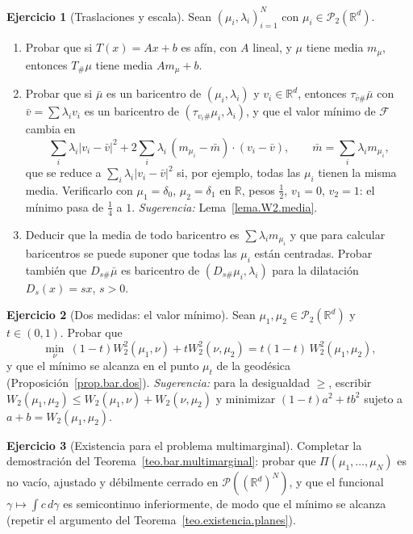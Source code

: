 \documentclass[12pt, a4paper]{amsbook}
\newcommand{\R}{{\mathbb R}}
\theoremstyle{remark}
\theoremstyle{definition}
\newtheorem{ejercicio}{Ejercicio}[chapter]
\numberwithin{section}{chapter}
\numberwithin{subsection}{section}
\numberwithin{equation}{section}
\numberwithin{figure}{chapter}
\begin{document}
\begin{ejercicio}[Traslaciones y escala]\label{ejer.bar.traslaciones}
Sean $(\mu_i,\lambda_i)_{i=1}^N$ con $\mu_i\in\mathcal P_2(\R^d)$.
\begin{enumerate}[label=(\alph*)]
\item Probar que si $T(x)=Ax+b$ es afín, con $A$ lineal, y
$\mu$ tiene media $m_\mu$, entonces $T_\#\mu$ tiene media $Am_\mu+b$.
\item Probar que si $\bar\mu$ es un baricentro de $(\mu_i,\lambda_i)$ y
$v_i\in\R^d$, entonces $\tau_{\bar v\#}\bar\mu$ con $\bar v=\sum\lambda_iv_i$
es un baricentro de $(\tau_{v_i\#}\mu_i,\lambda_i)$, y que el valor mínimo de
$\mathcal F$ cambia en
\[
\sum_i\lambda_i|v_i-\bar v|^2+2\sum_i\lambda_i\,(m_{\mu_i}-\bar m)\cdot(v_i-\bar v),
\qquad\bar m=\sum_i\lambda_im_{\mu_i},
\]
que se reduce a $\sum_i\lambda_i|v_i-\bar v|^2$ si, por ejemplo, todas las
$\mu_i$ tienen la misma media. Verificarlo con $\mu_1=\delta_0$,
$\mu_2=\delta_1$ en $\R$, pesos $\frac12$, $v_1=0$, $v_2=1$: el mínimo pasa
de $\frac14$ a $1$. \emph{Sugerencia:} Lema~\ref{lema.W2.media}.
\item Deducir que la media de todo baricentro es $\sum\lambda_im_{\mu_i}$ y
que para calcular baricentros se puede suponer que todas las $\mu_i$ están
centradas. Probar también que $D_{s\#}\bar\mu$ es baricentro de
$(D_{s\#}\mu_i,\lambda_i)$ para la dilatación $D_s(x)=sx$, $s>0$.
\end{enumerate}
\end{ejercicio}

\begin{ejercicio}[Dos medidas: el valor mínimo]\label{ejer.bar.dos.valor}
Sean $\mu_1,\mu_2\in\mathcal P_2(\R^d)$ y $t\in(0,1)$. Probar que
\[
\min_{\nu}\ (1-t)W_2^2(\mu_1,\nu)+tW_2^2(\nu,\mu_2)=t(1-t)\,W_2^2(\mu_1,\mu_2),
\]
y que el mínimo se alcanza en el punto $\mu_t$ de la geodésica
(Proposición~\ref{prop.bar.dos}). \emph{Sugerencia:} para la desigualdad
$\ge$, escribir $W_2(\mu_1,\mu_2)\le W_2(\mu_1,\nu)+W_2(\nu,\mu_2)$ y
minimizar $(1-t)a^2+tb^2$ sujeto a $a+b=W_2(\mu_1,\mu_2)$.
\end{ejercicio}

\begin{ejercicio}[Existencia para el problema multimarginal]\label{ejer.bar.multimarginal.existencia}
Completar la demostración del Teorema~\ref{teo.bar.multimarginal}:
probar que $\Pi(\mu_1,\dots,\mu_N)$ es no vacío, ajustado y débilmente
cerrado en $\mathcal P((\R^d)^N)$, y que el funcional $\gamma\mapsto\int c\,d\gamma$
es semicontinuo inferiormente, de modo que el mínimo se alcanza (repetir el
argumento del Teorema~\ref{teo.existencia.planes}).
\end{ejercicio}
\end{document}
